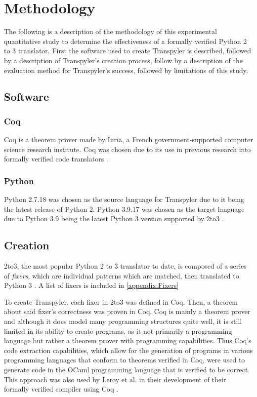 \section{Methodology}
The following is a description of the methodology of this experimental quantitative study to determine the effectiveness of a formally verified Python 2 to 3 translator. First the software used to create Transpyler is described, followed by a description of Transpyler's creation process, follow by a description of the evaluation method for Transpyler's success, followed by limitations of this study.

\subsection{Software}
\subsubsection{Coq}
Coq is a theorem prover made by Inria, a French government-supported computer science research institute. Coq was chosen due to its use in previous research into formally verified code translators \autocite{Leroy}\autocite{Zhao}.
\subsubsection{Python}
Python 2.7.18 was chosen as the source language for Transpyler due to it being the latest release of Python 2. Python 3.9.17 was chosen as the target language due to Python 3.9 being the latest Python 3 version supported by 2to3 \autocite{2to3}.

\subsection{Creation}
2to3, the most popular Python 2 to 3 translator to date, is composed of a series of \textit{fixers}, which are individual patterns which are matched, then translated to Python 3 \autocite{2to3}. A list of fixers is included in \ref{appendix:Fixers}

To create Transpyler, each fixer in 2to3 was defined in Coq. Then, a theorem about said fixer's correctness was proven in Coq. Coq is mainly a theorem prover and although it does model many programming structures quite well, it is still limited in its ability to create programs, as it not primarily a programming language but rather a theorem prover with programming capabilities. Thus Coq's code extraction capabilities, which allow for the generation of programs in various programming languages that conform to theorems verified in Coq, were used to generate code in the OCaml programming language that is verified to be correct. This approach was also used by Leroy et al. in their development of their formally verified compiler using Coq \autocite{Leroy}.


